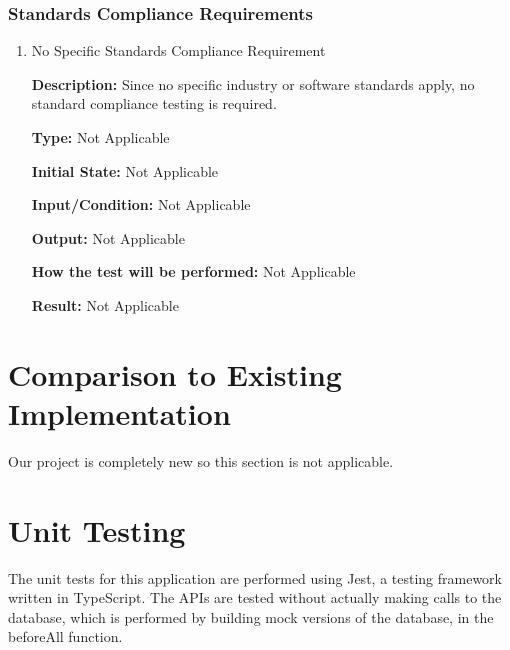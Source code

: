 \documentclass[12pt, titlepage]{article}
\begin{document}
\subsubsection{Standards Compliance Requirements}

\begin{enumerate}

\item{No Specific Standards Compliance Requirement\\}

\textbf{Description:} Since no specific industry or software standards apply, no standard compliance testing is required.

\textbf{Type:} Not Applicable

\textbf{Initial State:} Not Applicable

\textbf{Input/Condition:} Not Applicable

\textbf{Output:} Not Applicable

\textbf{How the test will be performed:} Not Applicable

\textbf{Result:} Not Applicable

\end{enumerate}
	
\section{Comparison to Existing Implementation}	

Our project is completely new so this section is not applicable. 

\section{Unit Testing} The unit tests for this application are performed using Jest, a testing framework written in TypeScript.
The APIs are tested without actually making calls to the database, which is performed by building mock versions of the database, in the beforeAll function.
\end{document}
